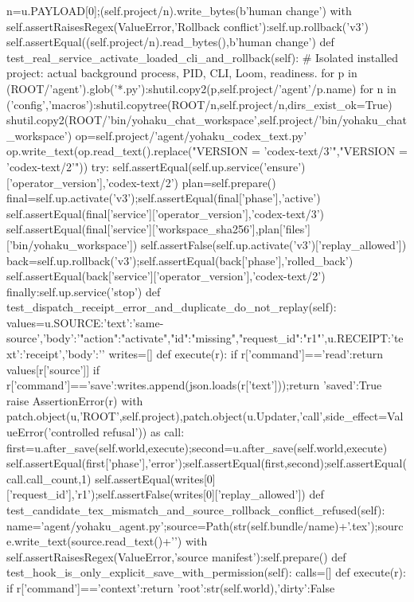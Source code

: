   n=u.PAYLOAD[0];(self.project/n).write_bytes(b'human change')
  with self.assertRaisesRegex(ValueError,'Rollback conflict'):self.up.rollback('v3')
  self.assertEqual((self.project/n).read_bytes(),b'human change')
 def test_real_service_activate_loaded_cli_and_rollback(self):
  # Isolated installed project: actual background process, PID, CLI, Loom, readiness.
  for p in (ROOT/'agent').glob('*.py'):shutil.copy2(p,self.project/'agent'/p.name)
  for n in ('config','macros'):shutil.copytree(ROOT/n,self.project/n,dirs_exist_ok=True)
  shutil.copy2(ROOT/'bin/yohaku_chat_workspace',self.project/'bin/yohaku_chat_workspace')
  op=self.project/'agent/yohaku_codex_text.py'
  op.write_text(op.read_text().replace("VERSION = 'codex-text/3'","VERSION = 'codex-text/2'"))
  try:
   self.assertEqual(self.up.service('ensure')['operator_version'],'codex-text/2')
   plan=self.prepare()
   final=self.up.activate('v3');self.assertEqual(final['phase'],'active')
   self.assertEqual(final['service']['operator_version'],'codex-text/3')
   self.assertEqual(final['service']['workspace_sha256'],plan['files']['bin/yohaku_workspace'])
   self.assertFalse(self.up.activate('v3')['replay_allowed'])
   back=self.up.rollback('v3');self.assertEqual(back['phase'],'rolled_back')
   self.assertEqual(back['service']['operator_version'],'codex-text/2')
  finally:self.up.service('stop')
 def test_dispatch_receipt_error_and_duplicate_do_not_replay(self):
  values={u.SOURCE:{'text':'same-source','body':'{"action":"activate","id":"missing","request_id":"r1"}'},u.RECEIPT:{'text':'receipt','body':'{}'}}
  writes=[]
  def execute(r):
   if r['command']=='read':return values[r['source']]
   if r['command']=='save':writes.append(json.loads(r['text']));return {'saved':True}
   raise AssertionError(r)
  with patch.object(u,'ROOT',self.project),patch.object(u.Updater,'call',side_effect=ValueError('controlled refusal')) as call:
   first=u.after_save(self.world,execute);second=u.after_save(self.world,execute)
  self.assertEqual(first['phase'],'error');self.assertEqual(first,second);self.assertEqual(call.call_count,1)
  self.assertEqual(writes[0]['request_id'],'r1');self.assertFalse(writes[0]['replay_allowed'])
 def test_candidate_tex_mismatch_and_source_rollback_conflict_refused(self):
  name='agent/yohaku_agent.py';source=Path(str(self.bundle/name)+'.tex');source.write_text(source.read_text()+'\n')
  with self.assertRaisesRegex(ValueError,'source manifest'):self.prepare()
 def test_hook_is_only_explicit_save_with_permission(self):
  calls=[]
  def execute(r):
   if r['command']=='context':return {'root':str(self.world),'dirty':False}
